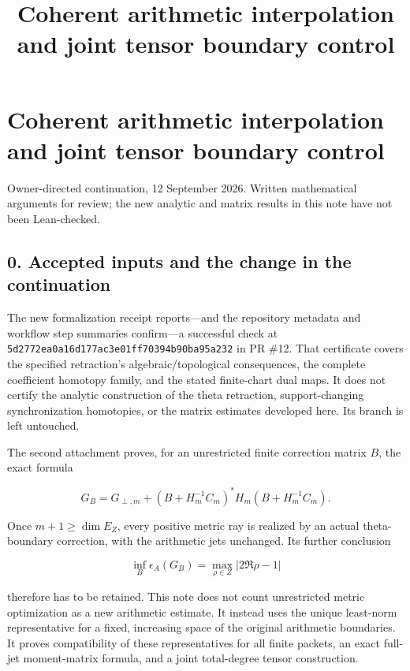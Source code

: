 \documentclass[
]{article}
\title{Coherent arithmetic interpolation and joint tensor boundary
control}
\author{}
\date{}
\begin{document}
\maketitle

\section{Coherent arithmetic interpolation and joint tensor boundary
control}\label{coherent-arithmetic-interpolation-and-joint-tensor-boundary-control}

Owner-directed continuation, 12 September 2026. Written mathematical
arguments for review; the new analytic and matrix results in this note
have not been Lean-checked.

\subsection{0. Accepted inputs and the change in the
continuation}\label{accepted-inputs-and-the-change-in-the-continuation}

The new formalization receipt reports---and the repository metadata and
workflow step summaries confirm---a successful check at
\texttt{5d2772ea0a16d177ac3e01ff70394b90ba95a232} in PR \#12. That
certificate covers the specified retraction's algebraic/topological
consequences, the complete coefficient homotopy family, and the stated
finite-chart dual maps. It does not certify the analytic construction of
the theta retraction, support-changing synchronization homotopies, or
the matrix estimates developed here. Its branch is left untouched.

The second attachment proves, for an unrestricted finite correction
matrix \(B\), the exact formula

\[G_B=G_{\perp,m}+(B+H_m^{-1}C_m)^*H_m(B+H_m^{-1}C_m).\tag{0.1}\]

Once \(m+1\ge\dim E_Z\), every positive metric ray is realized by an
actual theta-boundary correction, with the arithmetic jets unchanged.
Its further conclusion

\[\inf_B\epsilon_A(G_B)=\max_{\rho\in Z}|2\Re\rho-1|\tag{0.2}\]

therefore has to be retained. This note does not count unrestricted
metric optimization as a new arithmetic estimate. It instead uses the
unique least-norm representative for a fixed, increasing space of the
original arithmetic boundaries. It proves compatibility of these
representatives for all finite packets, an exact full-jet moment-matrix
formula, and a joint total-degree tensor construction.
\end{document}
